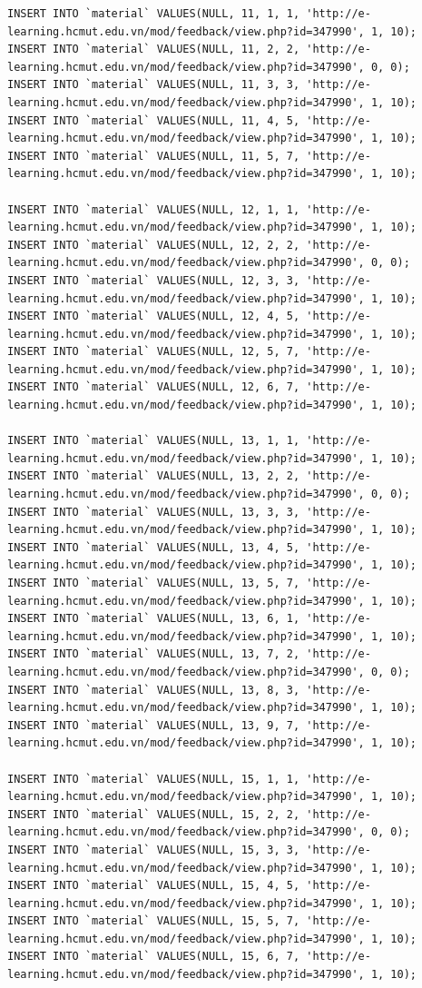 \documentclass[12pt,a4paper,titlepage]{article}
\begin{document}
\begin{lstlisting}
INSERT INTO `material` VALUES(NULL, 11, 1, 1, 'http://e-learning.hcmut.edu.vn/mod/feedback/view.php?id=347990', 1, 10);
INSERT INTO `material` VALUES(NULL, 11, 2, 2, 'http://e-learning.hcmut.edu.vn/mod/feedback/view.php?id=347990', 0, 0);
INSERT INTO `material` VALUES(NULL, 11, 3, 3, 'http://e-learning.hcmut.edu.vn/mod/feedback/view.php?id=347990', 1, 10);
INSERT INTO `material` VALUES(NULL, 11, 4, 5, 'http://e-learning.hcmut.edu.vn/mod/feedback/view.php?id=347990', 1, 10);
INSERT INTO `material` VALUES(NULL, 11, 5, 7, 'http://e-learning.hcmut.edu.vn/mod/feedback/view.php?id=347990', 1, 10);

INSERT INTO `material` VALUES(NULL, 12, 1, 1, 'http://e-learning.hcmut.edu.vn/mod/feedback/view.php?id=347990', 1, 10);
INSERT INTO `material` VALUES(NULL, 12, 2, 2, 'http://e-learning.hcmut.edu.vn/mod/feedback/view.php?id=347990', 0, 0);
INSERT INTO `material` VALUES(NULL, 12, 3, 3, 'http://e-learning.hcmut.edu.vn/mod/feedback/view.php?id=347990', 1, 10);
INSERT INTO `material` VALUES(NULL, 12, 4, 5, 'http://e-learning.hcmut.edu.vn/mod/feedback/view.php?id=347990', 1, 10);
INSERT INTO `material` VALUES(NULL, 12, 5, 7, 'http://e-learning.hcmut.edu.vn/mod/feedback/view.php?id=347990', 1, 10);
INSERT INTO `material` VALUES(NULL, 12, 6, 7, 'http://e-learning.hcmut.edu.vn/mod/feedback/view.php?id=347990', 1, 10);

INSERT INTO `material` VALUES(NULL, 13, 1, 1, 'http://e-learning.hcmut.edu.vn/mod/feedback/view.php?id=347990', 1, 10);
INSERT INTO `material` VALUES(NULL, 13, 2, 2, 'http://e-learning.hcmut.edu.vn/mod/feedback/view.php?id=347990', 0, 0);
INSERT INTO `material` VALUES(NULL, 13, 3, 3, 'http://e-learning.hcmut.edu.vn/mod/feedback/view.php?id=347990', 1, 10);
INSERT INTO `material` VALUES(NULL, 13, 4, 5, 'http://e-learning.hcmut.edu.vn/mod/feedback/view.php?id=347990', 1, 10);
INSERT INTO `material` VALUES(NULL, 13, 5, 7, 'http://e-learning.hcmut.edu.vn/mod/feedback/view.php?id=347990', 1, 10);
INSERT INTO `material` VALUES(NULL, 13, 6, 1, 'http://e-learning.hcmut.edu.vn/mod/feedback/view.php?id=347990', 1, 10);
INSERT INTO `material` VALUES(NULL, 13, 7, 2, 'http://e-learning.hcmut.edu.vn/mod/feedback/view.php?id=347990', 0, 0);
INSERT INTO `material` VALUES(NULL, 13, 8, 3, 'http://e-learning.hcmut.edu.vn/mod/feedback/view.php?id=347990', 1, 10);
INSERT INTO `material` VALUES(NULL, 13, 9, 7, 'http://e-learning.hcmut.edu.vn/mod/feedback/view.php?id=347990', 1, 10);

INSERT INTO `material` VALUES(NULL, 15, 1, 1, 'http://e-learning.hcmut.edu.vn/mod/feedback/view.php?id=347990', 1, 10);
INSERT INTO `material` VALUES(NULL, 15, 2, 2, 'http://e-learning.hcmut.edu.vn/mod/feedback/view.php?id=347990', 0, 0);
INSERT INTO `material` VALUES(NULL, 15, 3, 3, 'http://e-learning.hcmut.edu.vn/mod/feedback/view.php?id=347990', 1, 10);
INSERT INTO `material` VALUES(NULL, 15, 4, 5, 'http://e-learning.hcmut.edu.vn/mod/feedback/view.php?id=347990', 1, 10);
INSERT INTO `material` VALUES(NULL, 15, 5, 7, 'http://e-learning.hcmut.edu.vn/mod/feedback/view.php?id=347990', 1, 10);
INSERT INTO `material` VALUES(NULL, 15, 6, 7, 'http://e-learning.hcmut.edu.vn/mod/feedback/view.php?id=347990', 1, 10);


\end{lstlisting}
\end{document}
